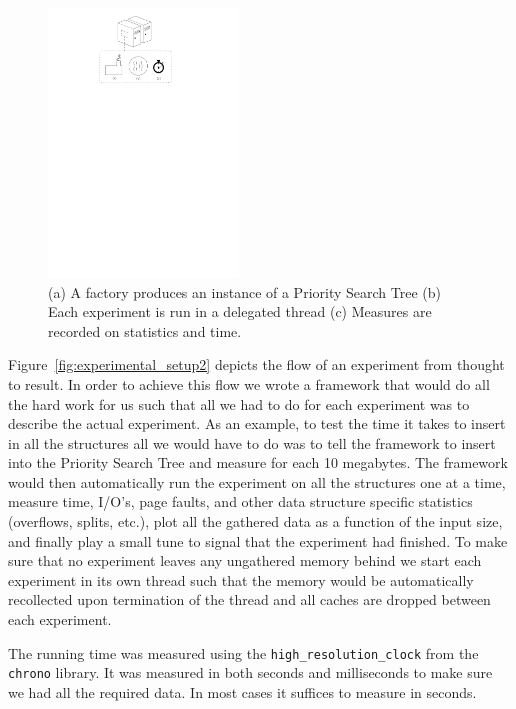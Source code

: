 \documentclass[twoside,11pt,openright]{report}
\begin{document}
\begin{figure}
\captionsetup{width=0.45\textwidth}
	\centering
		\includegraphics[width=0.45\textwidth]{../figures/experimental_setup_4}
	\caption{(a) A factory produces an instance of a Priority Search Tree (b) Each experiment is run in a delegated thread (c) Measures are recorded on statistics and time.}
	\label{fig:missing}
\end{figure}

Figure~\ref{fig:experimental_setup2} depicts the flow of an experiment from thought to result. In order to achieve this flow we wrote a framework that would do all the hard work for us such that all we had to do for each experiment was to describe the actual experiment. As an example, to test the time it takes to insert in all the structures all we would have to do was to tell the framework to insert into the Priority Search Tree and measure for each 10 megabytes. The framework would then automatically run the experiment on all the structures one at a time, measure time, I/O's, page faults, and other data structure specific statistics (overflows, splits, etc.), plot all the gathered data as a function of the input size, and finally play a small tune to signal that the experiment had finished. To make sure that no experiment leaves any ungathered memory behind we start each experiment in its own thread such that the memory would be automatically recollected upon termination of the thread and all caches are dropped between each experiment.

The running time was measured using the \texttt{high\_resolution\_clock} from the \texttt{chrono} library. It was measured in both seconds and milliseconds to make sure we had all the required data. In most cases it suffices to measure in seconds.
\end{document}
